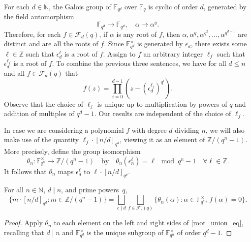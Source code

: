 \documentclass[Unicode,ALCO]{cedram}
\newcommand{\F}{\mathbb{F}}
\newcommand{\CF}{\mathcal{F}}
\newcommand{\N}{\mathbb{N}}
\newcommand{\Z}{\mathbb{Z}}
\newcommand{\eps}{\epsilon}
\newcommand{\te}{\theta}
\begin{document}
For each \(d \in \N\), the Galois group of \(\F_{q^d}\) over \(\F_q\) is cyclic of order \(d\), generated by the field automorphism
\[
\F_{q^d} \to \F_{q^d}, \quad \alpha \mapsto \alpha^q.
\]
Therefore, for each \(f \in \CF_d (q)\), if \(\alpha\) is any root of \(f\), then
\(\alpha,\alpha^q,\alpha^{q^2},\ldots,\alpha^{q^{d-1}}\)
are distinct and are all the roots of \(f\).
Since \(\F_{q^d}^\times\) is generated by \(\eps_d\), there exists some \(\ell \in \Z\) such that \(\eps_d^\ell\) is a root of \(f\).
Assign to \(f\) an arbitrary integer \(\ell_f\) such that \(\eps_d^{\ell_f}\) is a root of \(f\).
To combine the previous three sentences,
we have for all \(d \leq n\) and all \(f \in \CF_d(q)\) that
\begin{equation}
\label{who_are_my_roots}
f(z) = \prod_{i=0}^{d-1}
\left (
z - \left ( \eps_d^{\ell_f} \right )^{q^i}
\right ).
\end{equation}
Observe that the choice of \(\ell_f\) is unique up to multiplication by powers of \(q\) and addition of multiples of \(q^d - 1\).
Our results are independent of the choice of \(\ell_f\).

In case we are considering a polynomial \(f\) with degree \(d\) dividing \(n\), we will also make use of the quantity \(\ell_f \cdot [n/d]_{q^d}\), viewing it as an element of \(\Z / (q^n-1)\).
More precisely, define the group isomorphism
\begin{equation}
\label{te_n_def}
\te_n : \F_{q^n}^\times \to \Z / (q^n-1)
\quad \text{by} \quad
\te_n \left ( \eps_n^{\ell} \right ) = \ell \mod q^n-1
\quad
\forall \ell \in \Z.
\end{equation}
It follows that
\(\te_n\) maps \(\eps_d^{\ell}\) to \(\ell \cdot [n/d]_{q^d}\).

\begin{corollary}
\label{te_n_map_property}
For all \(n \in \N\), \(d \mid n\), and prime powers~\(q\),
\begin{equation}
\{ m \cdot [n/d]_{q^d} : m \in \Z / (q^n-1) \}
=
\bigsqcup_{c \mid d}
\bigsqcup_{f \in \CF_c (q)}
\{\te_n(\alpha) : \alpha \in \F_{q^c}^\times, \,  f(\alpha) = 0\}.
\end{equation}
\end{corollary}

\begin{proof}
Apply \(\te_n\) to each element on the left and right sides of \eqref{root_union_eq}, recalling that \(d \mid n\) and \(\F_{q^d}^\times\) is the unique subgroup of \(\F_{q^n}^\times\) of order \(q^d-1\).
\end{proof}
\end{document}
